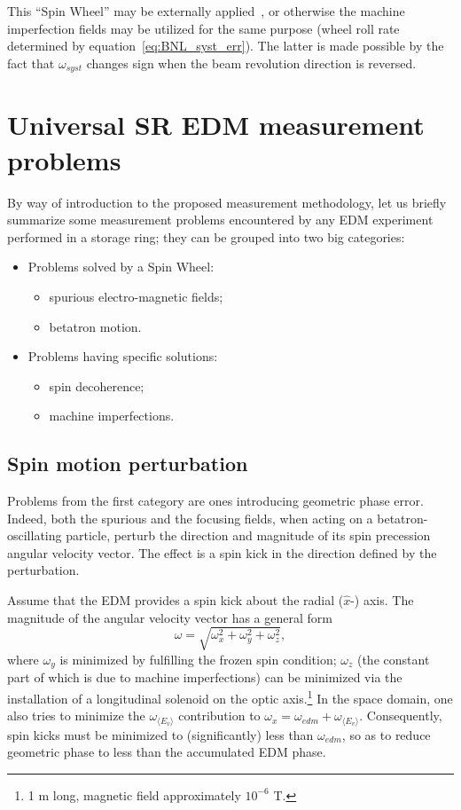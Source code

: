 \documentclass[a4paper]{jacow}
\newcommand{\w}{\omega}
\newcommand{\avg}[1]{\langle{#1}\rangle}
\newcommand{\wedm}{\w_{edm}}
\newcommand{\wimp}{\w_{\avg{E_v}}}
\begin{document}
This ``Spin Wheel'' may be externally applied~\cite{Koop:SW}, or otherwise the machine imperfection fields
may be utilized for the same purpose (wheel roll rate determined by equation~\eqref{eq:BNL_syst_err}).
The latter is made possible by the fact that $\w_{syst}$ changes sign when the beam revolution direction
is reversed.~\cite[p.~11]{BNL:Deuteron2008}

\section{Universal SR EDM measurement problems}

By way of introduction to the proposed measurement methodology, let us briefly summarize some measurement problems
encountered by any EDM experiment performed in a storage ring; they can be grouped into two big categories:
\begin{itemize}
\item Problems solved by a Spin Wheel:
  \begin{itemize}
  \item spurious electro-magnetic fields;
  \item betatron motion.
  \end{itemize}
\item Problems having specific solutions:
  \begin{itemize}
  \item spin decoherence;
  \item machine imperfections.
  \end{itemize}
\end{itemize}

\subsection{Spin motion perturbation}
Problems from the first category are ones introducing geometric phase error. Indeed, both the spurious 
and the focusing fields, when acting on a betatron-oscillating particle, perturb the direction and
magnitude of its spin precession angular velocity vector. The effect is a spin kick in the direction defined
by the perturbation.

Assume that the EDM provides a spin kick about the radial ($\hat x$-) axis. The magnitude of the angular
velocity vector has a general form
\[
\w = \sqrt{\w_x^2 + \w_y^2 + \w_z^2},
\]
where $\w_y$ is minimized by fulfilling the frozen spin condition; $\w_z$ (the constant part of which is
due to machine imperfections) can be minimized via the installation
of a longitudinal solenoid on the optic axis.\footnote{1 m long, magnetic field approximately $10^{-6}$ T.} In the
space domain, one also tries to minimize the $\wimp$ contribution to $\w_x = \wedm + \wimp$. Consequently,
spin kicks must be minimized to (significantly) less than $\wedm$, so as to reduce geometric phase to
less than the accumulated EDM phase.
\end{document}
